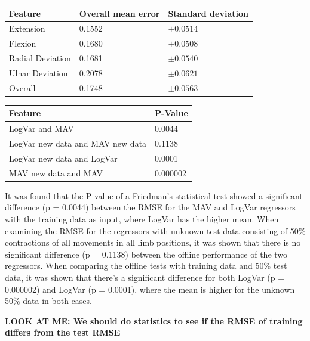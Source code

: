 	
	\begin{center}
		\begin{tabular}{l l l}
			\toprule
			\textbf{Feature} & \textbf{Overall mean error} & \textbf{Standard deviation}\\
			\midrule
			Extension & 0.1552 & $\pm 0.0514$ \\
			Flexion & 0.1680 & $\pm 0.0508$ \\
			Radial Deviation & 0.1681 & $\pm 0.0540$ \\
			Ulnar Deviation & 0.2078 & $\pm 0.0621$ \\
			Overall & 0.1748 & $\pm 0.0563$ \\
			\bottomrule
		\end{tabular}
	\end{center}
	
		\begin{center}
			\begin{tabular}{l l}
				\toprule
				\textbf{Feature} & \textbf{P-Value}\\
				\midrule
				LogVar and MAV & 0.0044 \\
				LogVar new data and MAV new data & 0.1138 \\
				LogVar new data and LogVar & 0.0001 \\
				MAV new data and MAV & 0.000002 \\
				\bottomrule
			\end{tabular}
		\end{center}
		
It was found that the P-value of a Friedman's statistical test showed a significant difference (p = 0.0044) between the RMSE for the MAV and LogVar regressors with the training data as input, where LogVar has the higher mean. When examining the RMSE for the regressors with unknown test data consisting of 50\% contractions of all movements in all limb positions, it was shown that there is no significant difference (p = 0.1138) between the offline performance of the two regressors. When comparing the offline tests with training data and 50\% test data, it was shown that there's a significant difference for both LogVar (p = 0.000002) and LogVar (p = 0.0001), where the mean is higher for the unknown 50\% data in both cases.

\textbf{LOOK AT ME: We should do statistics to see if the RMSE of training differs from the test RMSE}